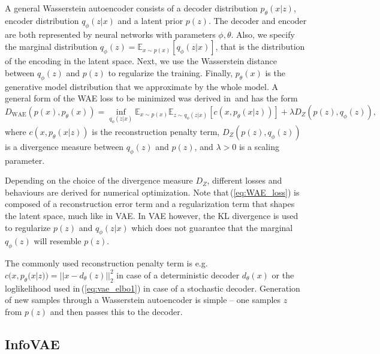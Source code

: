  

A general Wasserstein autoencoder consists of a decoder distribution
$p_{\theta}(x|z)$, encoder distribution $q_{\phi}(z|x)$ and a latent
prior $p(z)$. The decoder and encoder are both represented by neural
networks with parameters $\phi,\theta$. Also, we specify the marginal
distribution $q_{\phi}(z)=\mathbb{E}_{x\sim p(x)}\left[q_{\phi}(z|x)\right]$,
that is the distribution of the encoding in the latent space. Next,
we use the Wasserstein distance between $q_{\phi}(z)$ and $p(z)$
to regularize the training. Finally, $p_{\theta}(x)$ is the generative
model distribution that we approximate by the whole model. A general
form of the WAE loss to be minimized was derived in\,\cite{tolstikhin2017wasserstein}
and has the form
\begin{equation}
D_{\text{WAE}}(p(x),p_{\theta}(x))=\inf_{q_{\phi}(z|x)}\mathbb{E}_{x\sim p(x)}\mathbb{E}_{z\sim q_{\phi}(z|x)}\left[c(x,p_{\theta}(x|z))\right]+\lambda D_{Z}(p(z),q_{\phi}(z)),\label{eq:WAE_loss}
\end{equation}
where $c(x,p_{\theta}(x|z))$ is the reconstruction penalty term,
$D_{Z}(p(z),q_{\phi}(z))$ is a divergence measure between $q_{\phi}(z)$
and $p(z)$, and $\lambda>0$ is a scaling parameter. 

Depending on the choice of the divergence measure $D_{Z}$, different
losses and behaviours are derived for numerical optimization. Note
that\,(\ref{eq:WAE_loss}) is composed of a reconstruction error
term and a regularization term that shapes the latent space, much
like in VAE. In VAE however, the KL divergence is used to regularize
$p(z)$ and $q_{\phi}(z|x)$ which does not guarantee that the marginal
$q_{\phi}(z)$ will resemble $p(z)$. 

The commonly used reconstruction penalty term is e.g. $c(x,p_{\theta}(x|z))=||x-d_{\theta}(z)||_{2}^{2}$
in case of a deterministic decoder $d_{\theta}(x)$ or the loglikelihood
used in\,(\ref{eq:vae_elbo1}) in case of a stochastic decoder. Generation
of new samples through a Wasserstein autoencoder is simple -- one
samples $z$ from $p(z)$ and then passes this to the decoder.

\subsection{InfoVAE}

